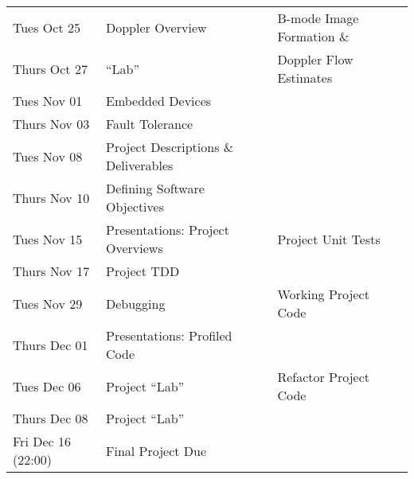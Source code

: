 \begin{longtable}[c]{|l|l|l|}
    \hline
    Tues Oct 25     & Doppler Overview & B-mode Image Formation \& \\
    Thurs Oct 27    & ``Lab'' & Doppler Flow Estimates \\
    \hline
    Tues Nov 01     & Embedded Devices & \\
    Thurs Nov 03    & Fault Tolerance & \\
    \hline
    Tues Nov 08     & Project Descriptions \& Deliverables & \\
    Thurs Nov 10    & Defining Software Objectives & \\
    \hline
    Tues Nov 15     & Presentations: Project Overviews  & Project Unit Tests \\
    Thurs Nov 17    & Project TDD & \\
    \hline
    Tues Nov 29     & Debugging & Working Project Code \\
    Thurs Dec 01    & Presentations: Profiled Code & \\
    \hline
    Tues Dec 06     & Project ``Lab'' & Refactor Project Code \\
    Thurs Dec 08    & Project ``Lab'' & \\
    \hline
    Fri Dec 16 (22:00) & Final Project Due  & \\
    \hline

\end{longtable}
